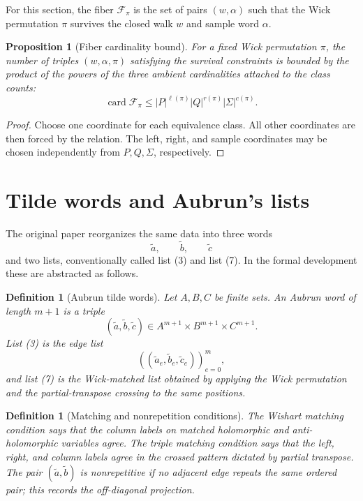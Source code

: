 \documentclass[11pt,oneside]{book}
\newtheorem{proposition}[theorem]{Proposition}
\newtheorem{definition}[theorem]{Definition}
\DeclareMathOperator{\card}{card}
\newcommand{\1}{\mathbf 1}
\begin{document}
For this section, the fiber \(\mathcal F_\pi\) is the set of pairs
\((w,\alpha)\) such that the Wick permutation \(\pi\) survives the closed walk
\(w\) and sample word \(\alpha\).

\begin{proposition}[Fiber cardinality bound]
For a fixed Wick permutation \(\pi\), the number of triples
\((w,\alpha,\pi)\) satisfying the survival constraints is bounded by the
product of the powers of the three ambient cardinalities attached to the class
counts:
\[
  \card \mathcal F_\pi
  \le
  |P|^{\ell(\pi)}|Q|^{r(\pi)}|\Sigma|^{c(\pi)}.
\]
\end{proposition}

\begin{proof}
Choose one coordinate for each equivalence class.  All other coordinates are
then forced by the relation.  The left, right, and sample coordinates may be
chosen independently from \(P,Q,\Sigma\), respectively.
\end{proof}

\section{Tilde words and Aubrun's lists}

The original paper reorganizes the same data into three words
\[
  \widetilde a,\qquad \widetilde b,\qquad \widetilde c
\]
and two lists, conventionally called list (3) and list (7).  In the formal
development these are abstracted as follows.

\begin{definition}[Aubrun tilde words]
Let \(A,B,C\) be finite sets.  An Aubrun word of length \(m+1\) is a triple
\[
  (\widetilde a,\widetilde b,\widetilde c)
  \in A^{m+1}\times B^{m+1}\times C^{m+1}.
\]
List (3) is the edge list
\[
  ((\widetilde a_e,\widetilde b_e,\widetilde c_e))_{e=0}^m,
\]
and list (7) is the Wick-matched list obtained by applying the Wick
permutation and the partial-transpose crossing to the same positions.
\end{definition}

\begin{definition}[Matching and nonrepetition conditions]
The Wishart matching condition says that the column labels on matched
holomorphic and anti-holomorphic variables agree.  The triple matching
condition says that the left, right, and column labels agree in the crossed
pattern dictated by partial transpose.  The pair
\((\widetilde a,\widetilde b)\) is nonrepetitive if no adjacent edge repeats
the same ordered pair; this records the off-diagonal projection.
\end{definition}
\end{document}
